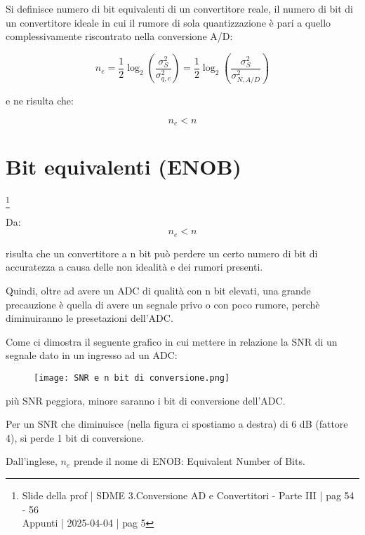 Si definisce numero di bit equivalenti di un convertitore reale, 
il numero di bit di un convertitore ideale in cui il rumore di sola quantizzazione è pari a quello complessivamente riscontrato nella conversione A/D: 

{
    \Large 
    \begin{equation}
        n_e 
        = 
        \frac{1}{2} \log_2 \left( \frac{\sigma_S ^{2}}{\sigma_{q, e} ^{2}}\right)
        = 
        \frac{1}{2} \log_2 \left( \frac{\sigma_S ^{2}}{\sigma_{N, A/D} ^{2}}\right)
    \end{equation}
}

e ne risulta che: 

{
    \Large 
    \begin{equation}
        n_e < n
    \end{equation}
}

\newpage 

\section{Bit equivalenti (ENOB)}
\footnote{Slide della prof | SDME 3.Conversione AD e Convertitori - Parte III | pag 54 - 56 \\  
Appunti | 2025-04-04 | pag 5}

Da: 
{
    \Large 
    \begin{equation}
        n_e < n
    \end{equation}
}

risulta che un convertitore a n bit può perdere un certo numero di bit di accuratezza a causa delle non idealità e dei rumori presenti. \newline 

Quindi, oltre ad avere un ADC di qualità con n bit elevati, 
una grande precauzione è quella di avere un segnale privo o con poco rumore, 
perchè diminuiranno le presetazioni dell'ADC. \newline 

Come ci dimostra il seguente grafico in cui mettere in relazione la SNR di un segnale dato in un ingresso ad un ADC: 

\begin{figure}[h]
    \centering
    \texttt{[image: SNR e n bit di conversione.png]}
\end{figure}

più SNR peggiora, minore saranno i bit di conversione dell'ADC. \newline 

Per un SNR che diminuisce (nella figura ci spostiamo a destra) di 6 dB (fattore 4), si perde 1 bit di conversione. \newline 

Dall'inglese, $n_e$ prende il nome di ENOB: Equivalent Number of Bits. \newline 

\newpage 

